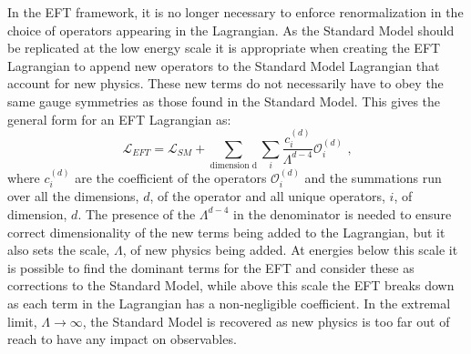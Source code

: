In the EFT framework, it is no longer necessary to enforce renormalization in the choice of operators appearing in the Lagrangian.  As the Standard Model should be replicated at the low energy scale it is appropriate when creating the EFT Lagrangian to append new operators to the Standard Model Lagrangian that account for new physics.  These new terms do not necessarily have to obey the same gauge symmetries as those found in the Standard Model.  This gives the general form for an EFT Lagrangian as:
%
\begin{equation}
\mathcal{L}_{EFT} = \mathcal{L}_{SM} + \sum_{\text{dimension d}} \sum_{i} \frac{c_{i}^{(d)}}{\Lambda^{d-4}} \mathcal{O}_{i}^{(d)} \text{ ,}
\end{equation}
%
\noindent where $c_{i}^{(d)}$ are the coefficient of the operators $\mathcal{O}_{i}^{(d)}$ and the summations run over all the dimensions, $d$, of the operator and all unique operators, $i$, of dimension, $d$.  The presence of the $\Lambda^{d-4}$ in the denominator is needed to ensure correct dimensionality of the new terms being added to the Lagrangian, but it also sets the scale, $\Lambda$, of new physics being added.  At energies below this scale it is possible to find the dominant terms for the EFT and consider these as corrections to the Standard Model, while above this scale the EFT breaks down as each term in the Lagrangian has a non-negligible coefficient.  In the extremal limit, $\Lambda \rightarrow \infty$, the Standard Model is recovered as new physics is too far out of reach to have any impact on observables.


